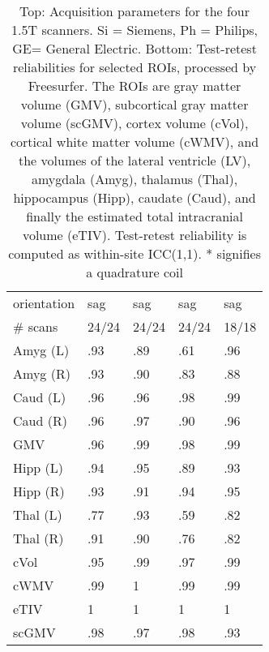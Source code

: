 \documentclass{article}
\begin{document}
\begin{table}[H]
\begin{tabular}{lllll}
orientation           &                sag &                sag &                  sag &                  sag \\
\# scans              & 24/24 & 24/24 & 24/24 &18/18\\
\midrule
Amyg (L)              &               .93 &               .89 &                 .61 &                 .96 \\
Amyg (R)              &               .93 &               .90 &                 .83 &                 .88 \\
Caud (L)              &               .96 &               .96 &                 .98 &                 .99 \\
Caud (R)              &               .96 &               .97 &                 .90 &                 .96 \\
GMV                   &               .96 &               .99 &                 .98 &                 .99 \\
Hipp (L)              &               .94 &               .95 &                 .89 &                 .93 \\
Hipp (R)              &               .93 &               .91 &                 .94 &                 .95 \\
Thal (L)              &               .77 &               .93 &                 .59 &                 .82 \\
Thal (R)              &               .91 &               .90 &                 .76 &                 .82 \\
cVol                  &               .95 &               .99 &                 .97 &                 .99 \\
cWMV                  &               .99 &               1 &                 .99 &                 .99 \\
eTIV                  &               1 &               1 &                 1 &                 1 \\
scGMV                 &               .98 &               .97 &                 .98 &                 .93 \\
\bottomrule
\end{tabular}
\caption{Top: Acquisition parameters for the four 1.5T scanners. Si = Siemens, Ph = Philips, GE= General Electric. Bottom: Test-retest reliabilities for selected ROIs, processed by Freesurfer. The ROIs are gray matter volume (GMV), subcortical gray matter volume (scGMV), cortex volume (cVol), cortical white matter volume (cWMV), and the volumes of the lateral ventricle (LV), amygdala (Amyg), thalamus (Thal), hippocampus (Hipp), caudate (Caud), and finally the estimated total intracranial volume (eTIV). Test-retest reliability is computed as within-site ICC(1,1). * signifies a quadrature coil} 
\label{tab:acquisition1}

\end{table}
\end{document}
